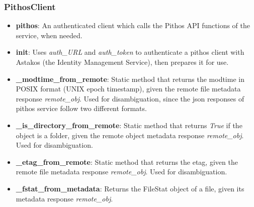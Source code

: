     \subsubsection{PithosClient}
      \begin{itemize}
        \item \textbf{pithos}: An authenticated client which calls the Pithos API functions of the service, when needed.\\
        \item \textbf{init}: Uses \emph{auth\_URL} and \emph{auth\_token} to authenticate a pithos client with Astakos (the Identity Management Service), then prepares it for use.
        \item \textbf{\_modtime\_from\_remote}: Static method that returns the modtime in POSIX format (UNIX epoch timestamp), given the remote file metadata response \emph{remote\_obj}. Used for disambiguation, since the json responses of pithos service follow two different formats.
        \item \textbf{\_is\_directory\_from\_remote}: Static method that returns \emph{True} if the object is a folder, given the remote object metadata response \emph{remote\_obj}. Used for disambiguation.
        \item \textbf{\_etag\_from\_remote}: Static method that returns the etag, given the remote file metadata response \emph{remote\_obj}. Used for disambiguation.
        \item \textbf{\_fstat\_from\_metadata}: Returns the FileStat object of a file, given its metadata response \emph{remote\_obj}.
      \end{itemize}

